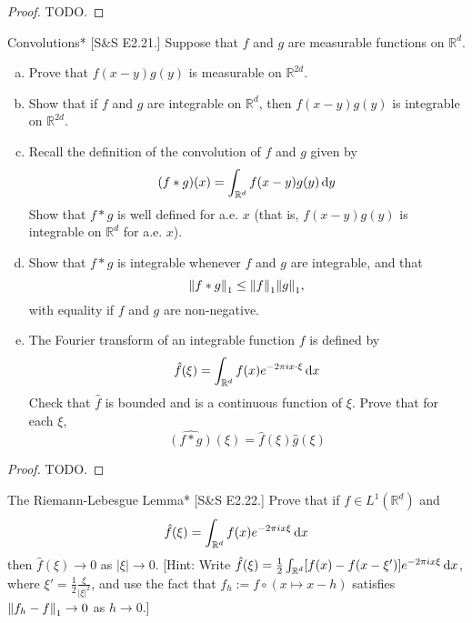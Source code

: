 \begin{proof}
    TODO. 
\end{proof}


\begin{problem}{Convolutions}*
    [S\&S E2.21.] Suppose that \( f \) and \( g \) are measurable functions on \( \mathbb{R}^d \).
    \begin{enumerate}[(a)]
        \itemsep0em
        \item Prove that \( f(x - y)g(y) \) is measurable on \( \mathbb{R}^{2d} \).
        \item Show that if \( f \) and \( g \) are integrable on \( \mathbb{R}^d \), then \( f(x - y)g(y) \) is integrable on \( \mathbb{R}^{2d} \).
        \item Recall the definition of the convolution of \( f \) and \( g \) given by
        \[
            (f * g)(x) = \int_{\mathbb{R}^d} f(x - y)g(y) \, \mathrm{d}y
        \]
        Show that \( f * g \) is well defined for a.e. \( x \) (that is, \( f(x - y)g(y) \) is integrable on \( \mathbb{R}^d \) for a.e. \( x \)).
        \item Show that \( f * g \) is integrable whenever \( f \) and \( g \) are integrable, and that
        \[
            \norm{f*g}_1 \leq \norm{f}_1 \norm{g}_1,
        \]
        with equality if \( f \) and \( g \) are non-negative.
        \item The Fourier transform of an integrable function \( f \) is defined by
        \[
            \hat{f}(\xi) = \int_{\mathbb{R}^d} f(x)e^{-2\pi i x \cdot \xi} \, \mathrm{d}x
        \]
        Check that \( \hat{f} \) is bounded and is a continuous function of \( \xi \). Prove that for each \( \xi \),
        \[
            \widehat{(f * g)}(\xi) = \hat{f}(\xi)\hat{g}(\xi)
        \]
    \end{enumerate}
\end{problem}

\begin{proof}
    TODO. 
\end{proof}


\begin{problem}{The Riemann-Lebesgue Lemma}*
    [S\&S E2.22.] Prove that if \(f \in L^1(\mathbb{R}^d)\) and 
    \[
        \hat{f}(\xi) = \int_{\mathbb{R}^d} f(x) e^{-2\pi i x \xi} \, \mathrm{d}x
    \]
    then \(\hat{f}(\xi) \to 0\) as \(|\xi| \to 0\). [Hint: Write \(\hat{f}(\xi) = \frac{1}{2} \int_{\mathbb{R}^d} [f(x) - f(x -\xi')] e^{-2\pi ix \xi} \, \mathrm{d}x\), where \(\xi' = \frac{1}{2} \frac{\xi}{|\xi|^2}\), and use the fact that \(f_h := f \circ (x \mapsto x -h)\) satisfies \(\norm{f_h - f}_1 \to 0\) as \(h \to 0\).]
\end{problem}

